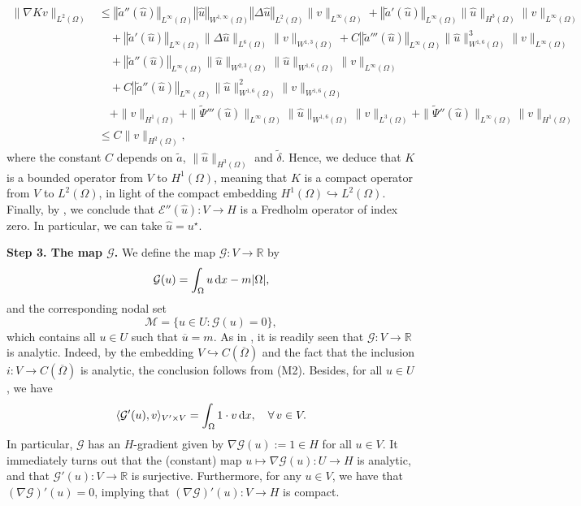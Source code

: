 \documentclass[11pt,reqno]{amsart}
\theoremstyle{remark}
\newcommand \norm[1] {\left\Vert #1\right\Vert}
\def\R{\mathbb{R}}
\def\d{{\rm d}}
\def\E{\mathcal{E}}
\numberwithin{equation}{section}
\def\d{{\rm d}}
\begin{document}
\begin{align*}
\| \nabla K v\|_{L^2(\Omega)}
&
\leq \norm{\widetilde{a}''(\widehat{u})}_{L^\infty(\Omega)}
\norm{\widehat{u}}_{W^{1,\infty}(\Omega)}
\norm{\Delta \widehat{u}}_{L^2(\Omega)}
\| v\|_{L^\infty(\Omega)}
+ \norm{\widetilde{a}'(\widehat{u})}_{L^\infty(\Omega)}
\| \widehat{u}\|_{H^3(\Omega)}
\| v\|_{L^\infty(\Omega)}
\\
& \quad
+  \norm{\widetilde{a}'(\widehat{u})}_{L^\infty(\Omega)}
\| \Delta \widehat{u}\|_{L^6(\Omega)}
\| v\|_{W^{1,3}(\Omega)}
+ C \norm{\widetilde{a}'''(\widehat{u})}_{L^\infty(\Omega)}
\| \widehat{u}\|_{W^{1,6}(\Omega)}^3
 \| v\|_{L^\infty(\Omega)}
 \\
 & \quad
 + \norm{\widetilde{a}''(\widehat{u})}_{L^\infty(\Omega)}
 \| \widehat{u}\|_{W^{2,3}(\Omega)}
 \| \widehat{u}\|_{W^{1,6}(\Omega)}
 \| v\|_{L^\infty(\Omega)}
 \\
 & \quad
 + C \norm{\widetilde{a}''(\widehat{u})}_{L^\infty(\Omega)}
 \| \widehat{u}\|_{W^{1,6}(\Omega)}^2
 \| v\|_{W^{1,6}(\Omega)}
 \\
 & \quad
 + \| v\|_{H^1(\Omega)} + \| \widetilde{\Psi}'''(\widehat{u}) \|_{L^\infty(\Omega)}
 \| \widehat{u}\|_{W^{1,6}(\Omega)} \| v \|_{L^3(\Omega)}
+ \| \widetilde{\Psi}''(\widehat{u}) \|_{L^\infty(\Omega)}
\|  v\|_{H^1(\Omega)}
 \\
 & \leq C \| v\|_{H^2(\Omega)},
\end{align*}
where the constant $C$ depends on $\widetilde{a}$, $\| \widehat{u}\|_{H^3(\Omega)}$ and $\widetilde{\delta}$.
Hence, we deduce that $K$ is a bounded operator from $V$ to $H^1(\Omega)$, meaning that $K$ is a compact operator from $V$ to $L^2(\Omega)$, in light of the compact embedding $H^1(\Omega) \hookrightarrow L^2(\Omega)$.
Finally, by \cite[Proposition 2.5]{RUPP}, we conclude that $\E''(\widehat{u}):V\to H$ is a Fredholm operator of index zero. In particular, we can take $\widehat{u}=u^\star$.

\medskip
{\bf Step 3. The map $\mathcal{G}$.}
We define the map $\mathcal{G}:V\to \R$ by
$$\mathcal{G}(u)=\int_\Omega u \,\d x - m|\Omega|,$$
and the corresponding nodal set
\begin{equation}
\label{manifold}
\mathcal{M}=\big\{u\in U: \mathcal{G}(u)=0\big\},
\end{equation}
which contains all $u\in U$ such that $\overline{u}=m$.
As in \cite[Lemma 7.2]{RUPP}, it is readily seen that $\mathcal{G}:V\to \R$ is analytic. Indeed,
by the embedding $V\hookrightarrow C(\overline{\Omega})$ and the fact that the inclusion $i: V\to C(\overline{\Omega})$ is analytic, the conclusion follows from (M2). Besides, for all $u\in U$, we have
$$
\langle \mathcal{G}'(u), v\rangle_{V' \times V}=\int_\Omega 1\cdot v \, \d x,\quad \forall \, v\in V.
$$
In particular, $\mathcal{G}$ has an $H$-gradient given by $\nabla\mathcal{G}(u):=1\in H$ for all $u\in V$.
It immediately turns out that the (constant) map $u\mapsto \nabla \mathcal{G}(u):U\to H$ is analytic, and that $\mathcal{G}'(u):V\to\R$ is surjective.
Furthermore, for any $u\in V$, we have that $(\nabla\mathcal{G})'(u)=0$, implying that $(\nabla\mathcal{G})'(u):V\to H$ is compact.
\smallskip
\end{document}
